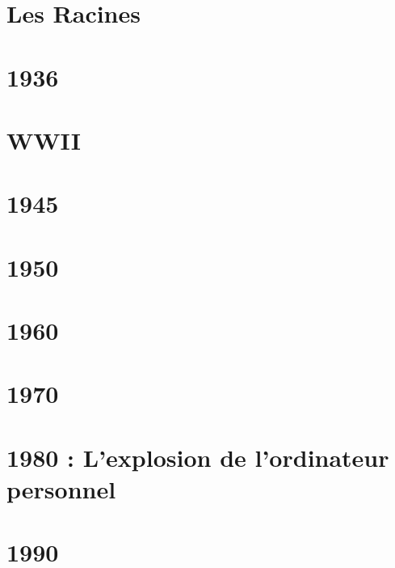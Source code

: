 \documentclass[a4paper, 11pt]{book}
\begin{document}
\chapter{Les Racines}

\chapter{1936}

\chapter{WWII}

\chapter{1945}

\chapter{1950}

\chapter{1960}

\chapter{1970}

\chapter{1980 : L'explosion de l'ordinateur personnel}



\chapter{1990}

\tableofcontents
\end{document}
